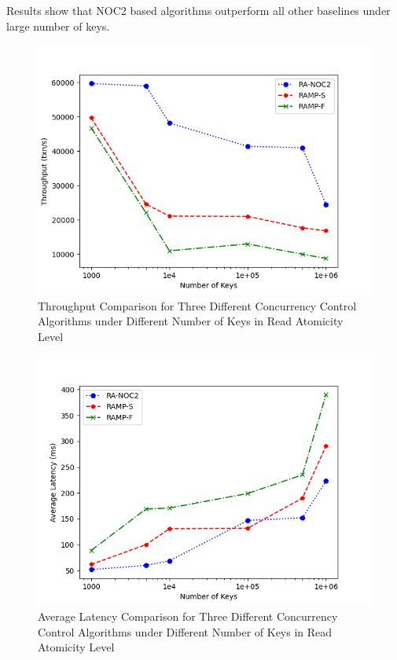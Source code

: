 Results show that NOC2 based algorithms outperform all other baselines under large number of keys.
\begin{figure}[H]
    \centering
    \includegraphics[width=0.8\linewidth]{figure/6-ra-t.png}
    \caption{Throughput Comparison for Three Different Concurrency Control Algorithms under Different Number of Keys in Read Atomicity Level}
    \label{fig:25}
\end{figure}
\begin{figure}[H]
    \centering
    \includegraphics[width=0.8\linewidth]{figure/6-ra-al.png}
    \caption{Average Latency Comparison for Three Different Concurrency Control Algorithms under Different Number of Keys in Read Atomicity Level}
    \label{fig:26}
\end{figure}
